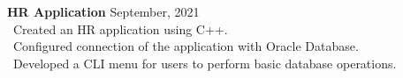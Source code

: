 {\textbf{HR Application} \hfill {September, 2021} \\
\hspace*{4pt} \textbullet~{Created an HR application using C++.} \\
\hspace*{4pt} \textbullet~{Configured connection of the application with Oracle Database.} \\
\hspace*{4pt} \textbullet~{Developed a CLI menu for users to perform basic database operations.}} \\
